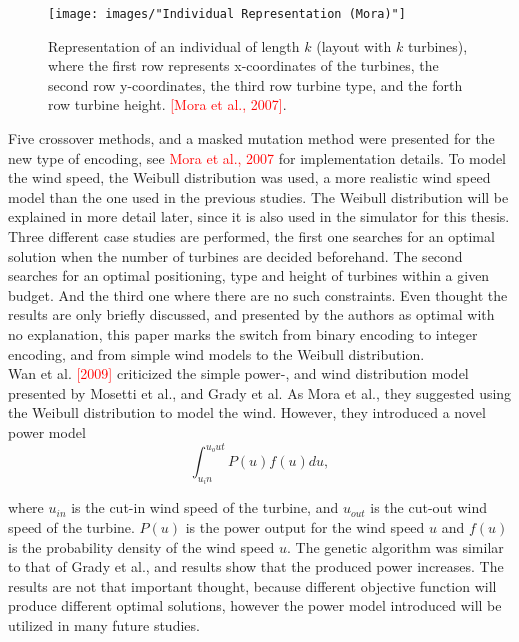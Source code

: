 \begin{figure}[h!]
\begin{center}
\texttt{[image: images/"Individual Representation (Mora)"]}
\caption{Representation of an individual of length $k$ (layout with $k$ turbines), where the first row represents x-coordinates of the turbines, the second row y-coordinates, the third row turbine type, and the forth row turbine height. \textcolor{red}{[Mora et al., 2007]}.}
\label{Individual Representation (Mora)}
\end{center}
\end{figure}


\noindent Five crossover methods, and a masked mutation method were presented for the new type of encoding, see \textcolor{red}{Mora et al., 2007} for implementation details. To model the wind speed, the Weibull distribution was used, a more realistic wind speed model than the one used in the previous studies. The Weibull distribution will be explained in more detail later, since it is also used in the simulator for this thesis. Three different case studies are performed, the first one searches for an optimal solution when the number of turbines are decided beforehand. The second searches for an optimal positioning, type and height of turbines within a given budget. And the third one where there are no such constraints. Even thought the results are only briefly discussed, and presented by the authors as optimal with no explanation, this paper marks the switch from binary encoding to integer encoding, and from simple wind models to the Weibull distribution.\\


\noindent Wan et al. \textcolor{red}{[2009]} criticized the simple power-, and wind distribution model presented by Mosetti et al., and Grady et al. As Mora et al., they suggested using the Weibull distribution to model the wind. However, they introduced a novel power model \\


\begin{equation}
\label{Power Model (Wan)}
\int_{u_in}^{u_out} P(u)f(u) du,
\end{equation}


\noindent where $u_{in}$ is the cut-in wind speed of the turbine, and $u_{out}$ is the cut-out wind speed of the turbine. $P(u)$ is the power output for the wind speed $u$ and $f(u)$ is the probability density of the wind speed $u$. The genetic algorithm was similar to that of Grady et al., and results show that the produced power increases. The results are not that important thought, because different objective function will produce different optimal solutions, however the power model introduced will be utilized in many future studies.\\


